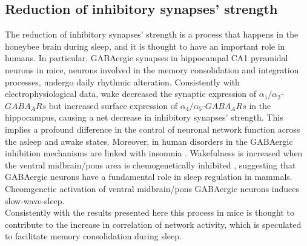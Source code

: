   \subsection{Reduction of inhibitory synapses' strength}
  The reduction of inhibitory synapses' strength is a process that happens in the honeybee brain during sleep, and it is thought to have an important role in humans.
  In particular, GABAergic synapses in hippocampal CA1 pyramidal neurons in mice, neurons involved in the memory consolidation and integration processes, undergo daily rhythmic alteration.
  Consistently with electrophysiological data, wake decreased the synaptic expression of $\alpha_1/\alpha_2$-$GABA_ARs$ but increased surface expression of $\alpha_4/\alpha_5$-$GABA_ARs$ in the hippocampus, causing a net decrease in inhibitory synapses' strength.
  This implies a profound difference in the control of neuronal network function across the asleep and awake states.
  Moreover, in human disorders in the GABAergic inhibition mechanisms are linked with insomnia \cite{insomnia}.
  Wakefulness is increased when the ventral midbrain/pons area is chemogenetically inhibited \cite{gaba-ventral}, suggesting that GABAergic neurons have a fundamental role in sleep regulation in mammals.
  Cheomgenetic activation of ventral midbrain/pons GABAergic neurons induces slow-wave-sleep.\\
  Consistently with the results presented here this process in mice is thought to contribute to the increase in correlation of network activity, which is speculated to facilitate memory consolidation during sleep.


